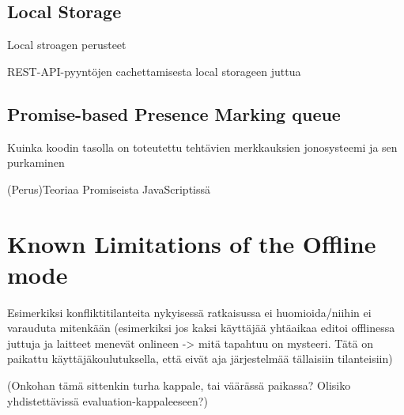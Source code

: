 \subsection{Local Storage}
Local stroagen perusteet

REST-API-pyyntöjen cachettamisesta local storageen juttua


\subsection{Promise-based Presence Marking queue}
Kuinka koodin tasolla on toteutettu tehtävien merkkauksien jonosysteemi ja sen purkaminen

(Perus)Teoriaa Promiseista JavaScriptissä


\section{Known Limitations of the Offline mode}
Esimerkiksi konfliktitilanteita nykyisessä ratkaisussa ei huomioida/niihin ei varauduta mitenkään (esimerkiksi jos kaksi käyttäjää yhtäaikaa editoi offlinessa juttuja ja laitteet menevät onlineen -> mitä tapahtuu on mysteeri. Tätä on paikattu käyttäjäkoulutuksella, että eivät aja järjestelmää tällaisiin tilanteisiin)


(Onkohan tämä sittenkin turha kappale, tai väärässä paikassa? Olisiko yhdistettävissä evaluation-kappaleeseen?)


